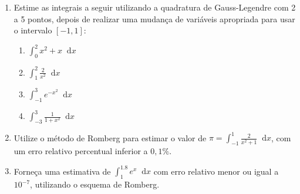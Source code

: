 \documentclass[12pt,a4paper]{article}
\newcommand*\diff{\mathop{}\!\mathrm{d}}
\begin{document}
\begin{enumerate}
\item Estime as integrais a seguir utilizando a quadratura de Gauss-Legendre com 2 a 5 pontos, depois de realizar uma mudança de variáveis apropriada para usar o intervalo $[-1,1]$:
\begin{multicols}{4}
\begin{enumerate}
\item $\int_0^2 x^2 + x\diff{x}$
\item $\int_1^2 \frac{2}{x^2}\diff{x}$
\item $\int_{-1}^3 e^{-x^2}\diff{x}$
\item $\int_{-3}^3 \frac{1}{1+x^2} \diff{x}$
\end{enumerate}
\end{multicols}

\item Utilize o método de Romberg para estimar o valor de $\pi = \int_{-1}^1 \frac{2}{x^2 + 1}\diff{x}$, com um erro relativo percentual inferior a $0,1\%$.

\item Forneça uma estimativa de $\int_1^{1.8} e^x\diff{x}$ com erro relativo menor ou igual a $10^{-7}$, utilizando o esquema de Romberg.


\end{enumerate}
\end{document}
